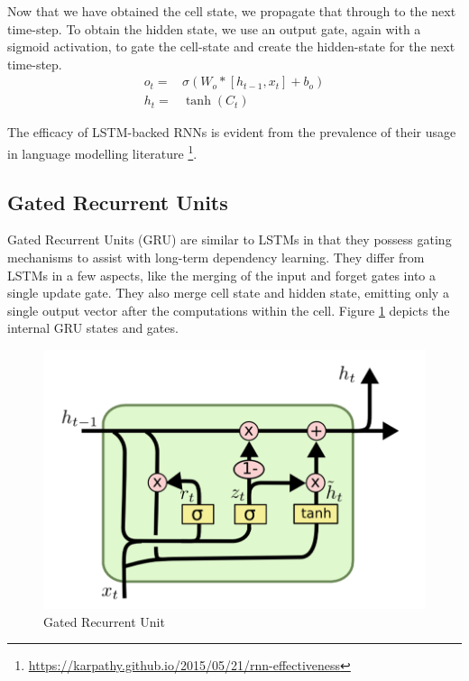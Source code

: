 Now that we have obtained the cell state, we propagate that through to the next time-step. To obtain the hidden state, we use an output gate, again with a sigmoid activation, to gate the cell-state and create the hidden-state for the next time-step.
\begin{align*}
	o_t =
	 & \sigma(W_o*[h_{t-1}, x_t] + b_o) \\
	h_t =
	 & \tanh(C_t)
\end{align*}

The efficacy of LSTM-backed RNNs is evident from the prevalence of their usage in language modelling literature \citep{sundermeyer2012lstm,gers2001lstm,graves2005framewise} \footnote{\url{https://karpathy.github.io/2015/05/21/rnn-effectiveness}}.

\subsection{Gated Recurrent Units}

Gated Recurrent Units (GRU) \citep{cho2014learning} are similar to LSTMs in that they possess gating mechanisms to assist with long-term dependency learning. They differ from LSTMs in a few aspects, like the merging of the input and forget gates into a single update gate. They also merge cell state and hidden state, emitting only a single output vector after the computations within the cell. Figure \ref{fig:gru} depicts the internal GRU states and gates.

\begin{figure}[ht]
	\centering
	\includegraphics[width=\textwidth]{images/gru}
	\caption{\label{fig:gru} Gated Recurrent Unit}
\end{figure}

